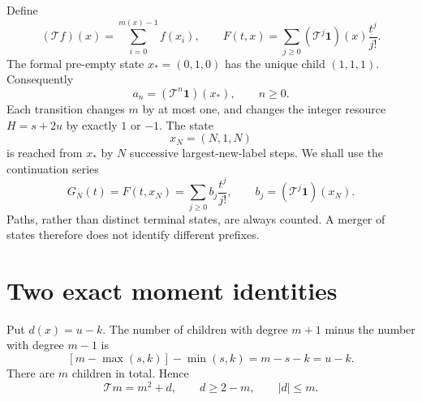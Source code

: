 \documentclass[11pt,letterpaper]{article}
\theoremstyle{remark}
\newcommand{\TT}{\mathcal T}
\newcommand{\one}{\mathbf 1}
\begin{document}
Define
\begin{equation}\label{a58:rt:eq:operator}
 (\TT f)(x)=\sum_{i=0}^{m(x)-1}f(x_i),\qquad
 F(t,x)=\sum_{j\ge0}(\TT^j\one)(x)\frac{t^j}{j!}.
\end{equation}
The formal pre-empty state $x_*=(0,1,0)$ has the unique child $(1,1,1)$.
Consequently
\begin{equation}\label{a58:rt:eq:root}
 a_n=(\TT^n\one)(x_*),\qquad n\ge0.
\end{equation}
Each transition changes $m$ by at most one, and changes the integer
resource $H=s+2u$ by exactly $1$ or $-1$. The state
\[
 x_N=(N,1,N)
\]
is reached from $x_*$ by $N$ successive largest-new-label steps.
We shall use the continuation series
\begin{equation}\label{a58:rt:eq:GN}
 G_N(t)=F(t,x_N)=\sum_{j\ge0}b_j\frac{t^j}{j!},
 \qquad b_j=(\TT^j\one)(x_N).
\end{equation}
Paths, rather than distinct terminal states, are always counted. A
merger of states therefore does not identify different prefixes.

\section{Two exact moment identities}\label{a58:rt:sec:moments}
Put $d(x)=u-k$. The number of children with degree $m+1$ minus the
number with degree $m-1$ is
\[
 [m-\max(s,k)]-\min(s,k)=m-s-k=u-k.
\]
There are $m$ children in total. Hence
\begin{equation}\label{a58:rt:eq:degreeidentity}
 \TT m=m^2+d,\qquad d\ge2-m,\qquad |d|\le m.
\end{equation}
\end{document}
